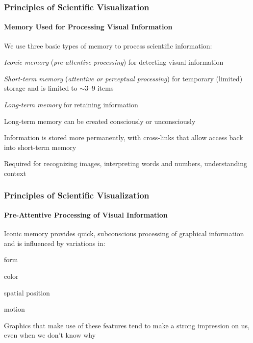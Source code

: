 \documentclass[10pt]{beamer}
\begin{document}
\begin{frame}
\frametitle{Principles of Scientific Visualization}
\framesubtitle{Memory Used for Processing Visual Information}

We use three basic types of memory to process
  scientific information:

\bi
\item {\color{blue} \em Iconic memory} ({\em pre-attentive
  processing}) for detecting visual information

\item {\color{blue} \em Short-term memory} ({\em attentive or
  perceptual processing}) for temporary (limited) storage and is
  limited to $\sim$3--9 items

\item {\color{blue} \em Long-term memory} for retaining information

            \bi
            {\scriptsize
            \item Long-term memory can be created consciously or unconsciously
            
            \vspace{1ex}
            \item Information is stored more permanently, with cross-links
              that allow access back into short-term memory
            
            \vspace{1ex}
            \item Required for recognizing images, interpreting words and
              numbers, understanding context\\
            }
            \ei
\ei
\end{frame}



\begin{frame}
\frametitle{Principles of Scientific Visualization}
\framesubtitle{Pre-Attentive Processing of Visual Information}

\bi 
\item {\color{blue} Iconic memory} provides quick, subconscious
  processing of graphical information and is influenced by variations
  in: 
\bi
  \item form
  \item color
  \item spatial position
  \item motion
  \ei

\item Graphics that make use of these features tend to make a strong
  impression on us, even when we don't know why

\ei

\end{frame}
\end{document}
